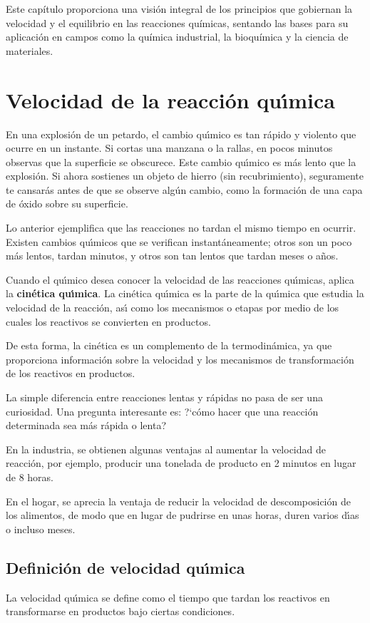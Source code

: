 Este capítulo proporciona una visión integral de los principios que gobiernan la velocidad y el equilibrio en las reacciones químicas, sentando las bases para su aplicación en campos como la química industrial, la bioquímica y la ciencia de materiales.

\section{Velocidad de la reacci\'on qu\'{\i}mica}
En una explosión de un petardo, el cambio qu\'{\i}mico es tan rápido y violento que ocurre en un instante. Si cortas una manzana o la rallas, en pocos minutos observas que la superficie se obscurece. Este cambio qu\'{\i}mico es m\'as lento que la explosión. Si ahora sostienes un objeto de hierro (sin recubrimiento), seguramente te cansar\'as antes de que se observe algún cambio, como la formación de una capa de óxido sobre su superficie.

Lo anterior ejemplifica que las reacciones no tardan el mismo tiempo en ocurrir. Existen cambios qu\'{\i}micos que se verifican instantáneamente; otros son un poco más lentos, tardan minutos, y otros son tan lentos que tardan meses o años.

Cuando el qu\'{\i}mico desea conocer la velocidad de las reacciones qu\'{\i}micas, aplica la \textbf{cinética qu\'{\i}mica}. La cinética qu\'{\i}mica es la parte de la qu\'{\i}mica que estudia la velocidad de la reacci\'on, as\'{\i} como los mecanismos o etapas por medio de los cuales los reactivos se convierten en productos.

De esta forma, la cinética es un complemento de la termodinámica, ya que proporciona información sobre la velocidad y los mecanismos de transformación de los reactivos en productos.

La simple diferencia entre reacciones lentas y rápidas no pasa de ser una curiosidad. Una pregunta interesante es: ?`cómo hacer que una reacción determinada sea m\'as rápida o lenta?

En la industria, se obtienen algunas ventajas al aumentar la velocidad de reacción, por ejemplo, producir una tonelada de producto en 2 minutos en lugar de 8 horas.

En el hogar, se aprecia la ventaja de reducir la velocidad de descomposición de los alimentos, de modo que en lugar de pudrirse en unas horas, duren varios d\'{\i}as o incluso meses.

\subsection{Definici\'on de velocidad qu\'{\i}mica}
La velocidad qu\'{\i}mica se define como el tiempo que tardan los reactivos en transformarse en productos bajo ciertas condiciones.

